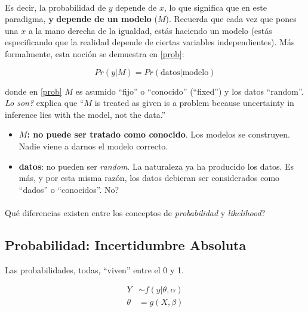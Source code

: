 \documentclass[10pt]{article}
\begin{document}
\paragraph{} Es decir, la probabilidad de $y$ depende de $x$, lo que significa que en este paradigma, ${\mathbf y}$ {\bf depende de un modelo} ($M$). Recuerda que cada vez que pones una $x$ a la mano derecha de la igualdad, est\'as haciendo un modelo (est\'as especificando que la realidad depende de ciertas variables independientes). M\'as formalmente, esta noci\'on se demuestra en \autoref{prob}:

\begin{equation} \label{prob}
Pr(y|M) = Pr(\text{datos}|\text{modelo})
\end{equation}

donde en \autoref{prob} $M$  es asumido ``fijo'' o ``conocido'' (``fixed'') y los datos ``random''. \emph{Lo son?} \textcite[16]{King1998} explica que ``$M$ is treated as given is a problem because uncertainty in inference lies with the model, not the data.'' 

\begin{itemize}
  \item {\bf $M$: no puede ser tratado como conocido}. Los modelos se construyen. Nadie viene a darnos el modelo correcto.
  \item {\bf datos}: no pueden ser \emph{random}. La naturaleza ya ha producido los datos. Es m\'as, y por esta misma raz\'on, los datos debieran ser considerados como ``dados'' o ``conocidos''. No? 
\end{itemize}

\paragraph{} Qu\'e diferencias existen entre los conceptos de \emph{probabilidad} y \emph{likelihood}?

\subsection*{Probabilidad: Incertidumbre Absoluta}

Las probabilidades, todas, ``viven'' entre el 0 y 1. 

\begin{equation} \label{prob:model}
\begin{split}
Y & \sim f(y|\theta, \alpha) \\
\theta & = g(X, \beta)
\end{split}
\end{equation}
\end{document}
